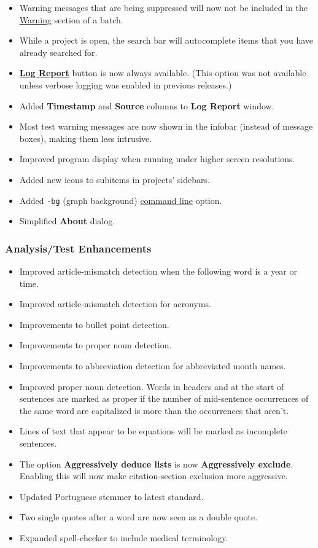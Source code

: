 \documentclass[
]{book}
\providecommand{\tightlist}{%
  \setlength{\itemsep}{0pt}\setlength{\parskip}{0pt}}
\theoremstyle{definition}
\theoremstyle{definition}
\theoremstyle{definition}
\theoremstyle{definition}
\theoremstyle{remark}
\begin{document}
\begin{itemize}
\item
  Warning messages that are being suppressed will now not be included in the \protect\hyperlink{reviewing-batch-warnings}{Warning} section of a batch.
\item
  While a project is open, the search bar will autocomplete items that you have already searched for.
\item
  \protect\hyperlink{log-report}{\textbf{Log Report}} button is now always available. (This option was not available unless verbose logging was enabled in previous releases.)
\item
  Added \textbf{Timestamp} and \textbf{Source} columns to \textbf{Log Report} window.
\item
  Most test warning messages are now shown in the infobar (instead of message boxes), making them less intrusive.
\item
  Improved program display when running under higher screen resolutions.
\item
  Added new icons to subitems in projects' sidebars.
\item
  Added \texttt{-bg} (graph background) \protect\hyperlink{command-line-options}{command line} option.
\item
  Simplified \textbf{About} dialog.
\end{itemize}

\hypertarget{analysistest-enhancements-1}{%
\subsubsection*{Analysis/Test Enhancements}\label{analysistest-enhancements-1}}

\begin{itemize}
\tightlist
\item
  Improved article-mismatch detection when the following word is a year or time.
\item
  Improved article-mismatch detection for acronyms.
\item
  Improvements to bullet point detection.
\item
  Improvements to proper noun detection.
\item
  Improvements to abbreviation detection for abbreviated month names.
\item
  Improved proper noun detection. Words in headers and at the start of sentences are marked as proper if the number of mid-sentence occurrences of the same word are capitalized is more than the occurrences that aren't.
\item
  Lines of text that appear to be equations will be marked as incomplete sentences.
\item
  The option \textbf{Aggressively deduce lists} is now \textbf{Aggressively exclude}. Enabling this will now make citation-section exclusion more aggressive.
\item
  Updated Portuguese stemmer to latest standard.
\item
  Two single quotes after a word are now seen as a double quote.
\item
  Expanded spell-checker to include medical terminology.
\end{itemize}
\end{document}
